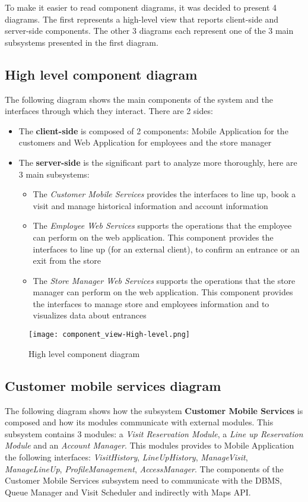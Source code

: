 To make it easier to read component diagrams, it was decided to present 4 diagrams. The first represents a high-level view that reports client-side and server-side components. The other 3 diagrams each represent one of the 3 main subsystems presented in the first diagram.
\subsection{High level component diagram}
    The following diagram shows the main components of the system and the interfaces through which they interact. There are 2 sides:
    \begin{itemize}
        \item The \textbf{client-side} is composed of 2 components: Mobile Application for the customers and Web Application for employees and the store manager
        \item The \textbf{server-side} is the significant part to analyze more thoroughly, here are 3 main subsystems: \begin{itemize}
            \item The \textit{Customer Mobile Services} provides the interfaces to line up, book a visit and manage historical information and account information
            \item The \textit{Employee Web Services} supports the operations that the employee can perform on the web application. This component provides the interfaces to line up (for an external client), to confirm an entrance or an exit from the store
            \item The \textit{Store Manager Web Services} supports the operations that the store manager can perform on the web application. This component provides the interfaces to manage store and employees information and to visualizes data about entrances
        \end{itemize}
    \end{itemize}

    \begin{figure}[H]
        \centering
        \texttt{[image: component\_view-High-level.png]}
        \caption{High level component diagram}
    \end{figure}

\subsection{Customer mobile services diagram}

    The following diagram shows how the subsystem \textbf{Customer Mobile Services} is composed and how its modules communicate with external modules. This subsystem contains 3 modules: a \textit{Visit Reservation Module}, a \textit{Line up Reservation Module} and an \textit{Account Manager}. This modules provides to Mobile Application the following interfaces: \textit{VisitHistory}, \textit{LineUpHistory}, \textit{ManageVisit}, \textit{ManageLineUp}, \textit{ProfileManagement}, \textit{AccessManager}. The components of the Customer Mobile Services subsystem need to communicate with the DBMS, Queue Manager and Visit Scheduler and indirectly with Maps API.


